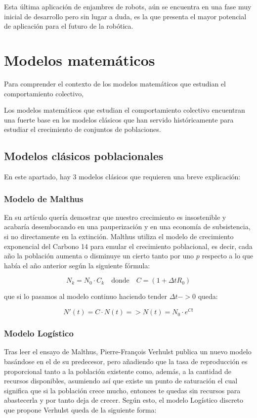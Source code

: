 Esta última aplicación de enjambres de robots, aún se encuentra en una fase muy inicial de desarrollo pero sin lugar a duda, es la que presenta el mayor potencial de aplicación para el futuro de la robótica.


\section{Modelos matemáticos} \label{s2_2}
Para comprender el contexto de los modelos matemáticos que estudian el comportamiento colectivo, 

Los modelos matemáticos que estudian el comportamiento colectivo encuentran una fuerte base en los modelos clásicos que han servido históricamente para estudiar el crecimiento de conjuntos de poblaciones.

\subsection{Modelos clásicos poblacionales} \label{s2_2_1}
En este apartado, hay 3 modelos clásicos que requieren una breve explicación:

\subsubsection{Modelo de Malthus}
En su artículo \cite{malthus1846ensayo} quería demostrar que nuestro crecimiento es insostenible y acabaría desembocando en una pauperización y en una economía de subsistencia, si no directamente en la extinción. Malthus utiliza el modelo de crecimiento exponencial del Carbono 14 para emular el crecimiento poblacional, es decir, cada año la población aumenta o disminuye un cierto tanto por uno $p$ respecto a lo que había el año anterior según la siguiente fórmula:

\begin{equation}
    N_{k} = N_0\cdot C_k \quad \textrm{donde} \quad C = (1+\Delta tR_0)
\end{equation}

\noindent que si lo pasamos al modelo continuo haciendo tender $\Delta t -> 0$ queda:

\begin{equation}
    N'(t) = C \cdot N(t) => N(t) = N_0 \cdot e^{Ct}
\end{equation}

\subsubsection{Modelo Logístico}
Tras leer el ensayo de Malthus, Pierre-Fran\c{c}ois Verhulst \cite[Cap.~37,38]{haberman1998mathematical} publica un nuevo modelo basándose en el de su predecesor, pero añadiendo que la tasa de reproducción es proporcional tanto a la población existente como, además, a la cantidad de recursos disponibles, asumiendo así que existe un punto de saturación el cual significa que si la población crece mucho, entonces te quedas sin recursos para abastecerla y por tanto deja de crecer. Según esto, el modelo Logístico discreto que propone Verhulst queda de la siguiente forma:

